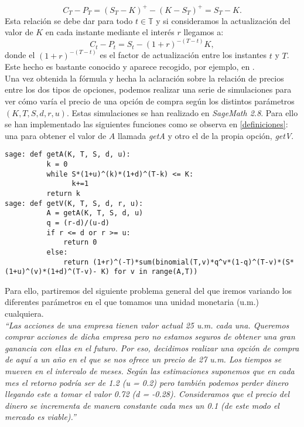 \[
C_T - P_T = (S_T - K)^+ - (K-S_T)^+ = S_T - K.
\]
Esta relación se debe dar para todo $ t \in \mathbb{T} $ y si consideramos la actualización del valor de $ K $ en cada instante mediante el interés $ r $ llegamos a:
\[
C_t - P_t = S_t - (1+r)^{-(T-t)}K,
\]
donde el $ (1+r)^{-(T-t)} $ es el factor de actualización entre los instantes $ t $ y $ T $. Este hecho es bastante conocido y aparece recogido, por ejemplo, en \cite{elliot1999mathematics}.\\

Una vez obtenida la fórmula y hecha la aclaración sobre la relación de precios entre los dos tipos de opciones, podemos realizar una serie de simulaciones para ver cómo varía el precio de una opción de compra según los distintos parámetros $ (K, T, S, d, r, u) $. Estas simulaciones se han realizado en  \textit{SageMath 2.8}. Para ello se han implementado las siguientes funciones como se observa en \ref{definiciones}: una para obtener el valor de $ A $ llamada \textit{getA} y otro el de la propia opción, \textit{getV}.

\begin{lstlisting}[label={definiciones}, caption={Definición en Sage de las funciones}, morekeywords={sage}]
sage: def getA(K, T, S, d, u):
          k = 0
          while S*(1+u)^(k)*(1+d)^(T-k) <= K:
                k+=1
          return k
sage: def getV(K, T, S, d, r, u):
          A = getA(K, T, S, d, u)
          q = (r-d)/(u-d)
          if r <= d or r >= u:
              return 0
          else:
              return (1+r)^(-T)*sum(binomial(T,v)*q^v*(1-q)^(T-v)*(S*(1+u)^(v)*(1+d)^(T-v)- K) for v in range(A,T))           	 
\end{lstlisting}

Para ello, partiremos del siguiente problema general del que iremos variando los diferentes parámetros en el que tomamos una unidad monetaria (u.m.) cualquiera. \\

\textit{``Las acciones de una empresa tienen valor actual 25 u.m. cada una. Queremos comprar acciones de dicha empresa pero no estamos seguros de obtener una gran ganancia con ellas en el futuro. Por eso, decidimos realizar una opción de compra de aquí a un año en el que se nos ofrece un precio de 27 u.m. Los tiempos se mueven en el intervalo de meses. Según las estimaciones suponemos que en cada mes el retorno podría ser de 1.2 (u = 0.2)  pero también podemos perder dinero llegando este a tomar el valor 0.72 (d = -0.28). Consideramos que el precio del dinero se incrementa de manera constante cada mes un 0.1 (de este modo el mercado es viable).''} \\

